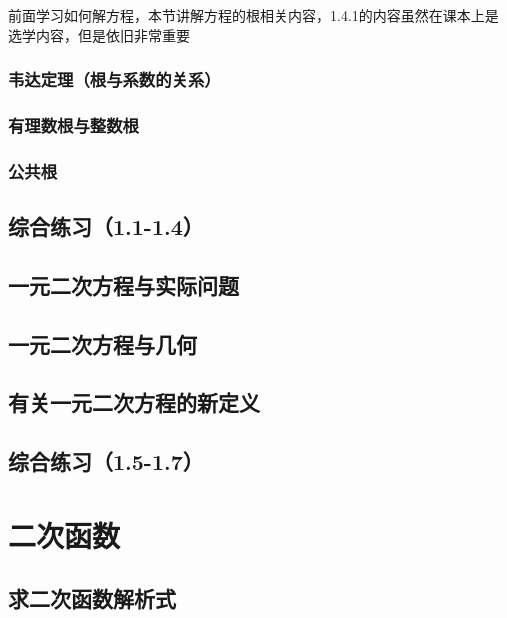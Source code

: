 \documentclass[lang=cn, 10pt, titlestyle=display, oneside, toc=twocol]{elegantbook}
\begin{document}
前面学习如何解方程，本节讲解方程的根相关内容，1.4.1的内容虽然在课本上是选学内容，但是依旧非常重要

\subsection{韦达定理（根与系数的关系）}

\subsection{有理数根与整数根}

\subsection{公共根}
\section{综合练习（1.1-1.4）}





\section{一元二次方程与实际问题}

\section{一元二次方程与几何}

\section{有关一元二次方程的新定义}

\section{综合练习（1.5-1.7）}



\chapter{二次函数}


\section{求二次函数解析式}
\end{document}

